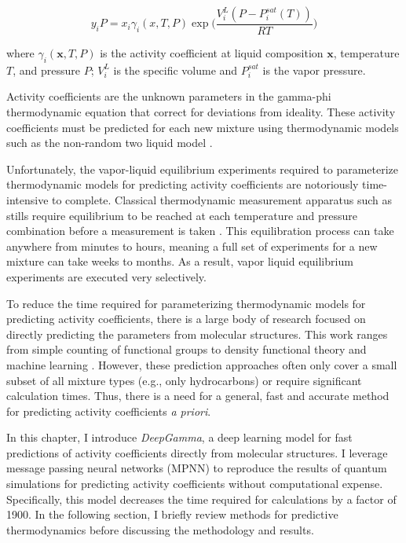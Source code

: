 \begin{equation}
    \label{gamma-phi}
    y_i P = x_i \gamma_i(x,T,P)   \exp \biggl(\frac{V_i^L(P-P_i^{sat}(T))}{RT}\biggr)
\end{equation}

where $\gamma_i(\mathbf x,T,P)$ is the activity coefficient at liquid composition $\mathbf x$,  temperature $T$, and pressure $P$; $V_i^L$ is the specific volume and $P_i^{sat}$ is the vapor pressure.  

Activity coefficients are the unknown parameters in the gamma-phi thermodynamic equation that correct for deviations from ideality. These activity coefficients must be predicted for each new mixture using thermodynamic models such as the non-random two liquid model \cite{Renon1968}. 

Unfortunately, the vapor-liquid equilibrium experiments required to parameterize thermodynamic models for predicting activity coefficients are notoriously time-intensive to complete. Classical thermodynamic measurement apparatus such as stills require equilibrium to be reached at each temperature and pressure combination before a measurement is taken \cite{Ronc1976, Dechambre2014}. This equilibration process can take anywhere from minutes to hours, meaning a full set of experiments for a new mixture can take weeks to months. As a result, vapor liquid equilibrium experiments are executed very selectively.

To reduce the time required for parameterizing thermodynamic models for predicting activity coefficients, there is a large body of research focused on directly predicting the parameters from molecular structures. This work ranges from simple counting of functional groups \cite{Fredenslund1975} to density functional theory \cite{ Klamt2010} and machine learning \cite{Urata2002, Nami2011,  Jirasek2020}.  However, these prediction approaches often only cover a small subset of all mixture types (e.g., only hydrocarbons) or require significant calculation times. Thus, there is a need for a general, fast and accurate method for predicting activity coefficients \textit{a priori}.

In this chapter, I introduce \textit{DeepGamma}, a deep learning model for fast predictions of activity coefficients directly from molecular structures.  I leverage message passing neural networks (MPNN) to reproduce the results of quantum simulations for predicting activity coefficients without computational expense. Specifically, this model decreases the time required for calculations by a factor of 1900. In the following section, I briefly review methods for predictive thermodynamics before discussing the methodology and results.

